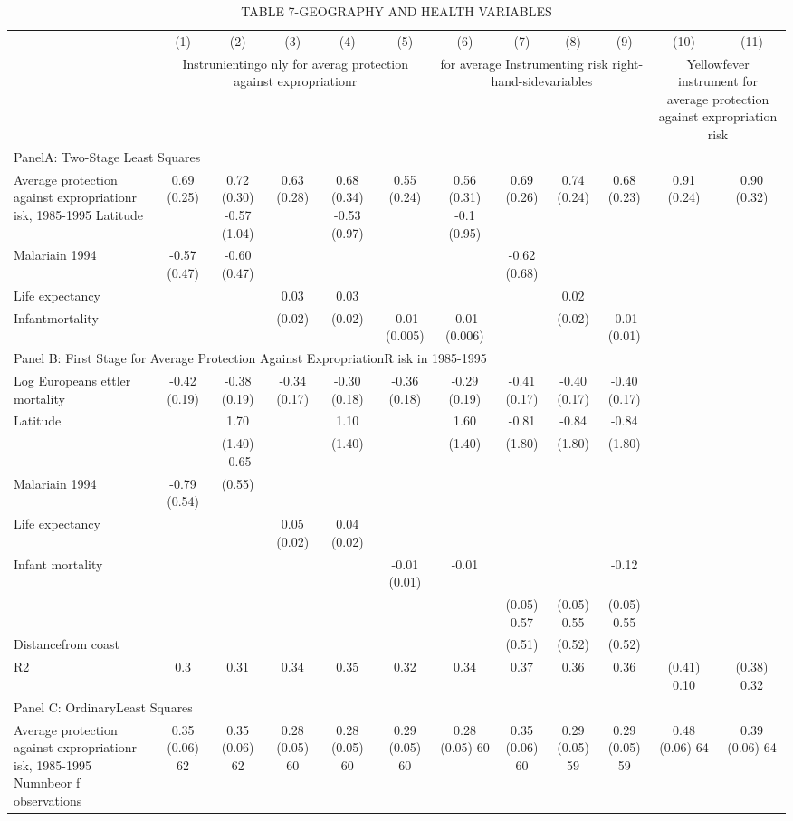 \begin{table}[htbp]
\centering
\caption{TABLE  7-GEOGRAPHY AND HEALTH  VARIABLES}
\begin{tabular}{lccccccccccc}
\hline
 & (1) & (2) & (3) & (4) & (5) & (6) & (7) & (8) & (9) & (10) & (11) \\
 & \multicolumn{5}{c}{Instrunientingo nly for averag protection against expropriationr} & \multicolumn{4}{c}{for average Instrumenting risk right-hand-sidevariables} & \multicolumn{2}{c}{Yellowfever instrument for average protection against expropriation risk} \\
\multicolumn{12}{l}{PanelA: Two-Stage Least Squares} \\
Average protection against expropriationr isk, 1985-1995 Latitude & 0.69 (0.25) & 0.72 (0.30) -0.57 (1.04) & 0.63 (0.28) & 0.68 (0.34) -0.53 (0.97) & 0.55 (0.24) & 0.56 (0.31) -0.1 (0.95) & 0.69 (0.26) & 0.74 (0.24) & 0.68 (0.23) & 0.91 (0.24) & 0.90 (0.32) \\
Malariain 1994 & -0.57 (0.47) & -0.60 (0.47) &  &  &  &  & -0.62 (0.68) &  &  &  &  \\
Life expectancy &  &  & 0.03 & 0.03 &  &  &  & 0.02 &  &  &  \\
Infantmortality &  &  & (0.02) & (0.02) & -0.01 (0.005) & -0.01 (0.006) &  & (0.02) & -0.01 (0.01) &  &  \\
\multicolumn{12}{l}{Panel B: First Stage for Average Protection Against ExpropriationR isk in 1985-1995} \\
Log Europeans ettler mortality & -0.42 (0.19) & -0.38 (0.19) & -0.34 (0.17) & -0.30 (0.18) & -0.36 (0.18) & -0.29 (0.19) & -0.41 (0.17) & -0.40 (0.17) & -0.40 (0.17) &  &  \\
Latitude &  & 1.70 &  & 1.10 &  & 1.60 & -0.81 & -0.84 & -0.84 &  &  \\
 &  & (1.40) -0.65 &  & (1.40) &  & (1.40) & (1.80) & (1.80) & (1.80) &  &  \\
Malariain 1994 & -0.79 (0.54) & (0.55) &  &  &  &  &  &  &  &  &  \\
Life expectancy &  &  & 0.05 (0.02) & 0.04 (0.02) &  &  &  &  &  &  &  \\
Infant mortality &  &  &  &  & -0.01 (0.01) & -0.01 &  &  & -0.12 &  &  \\
 &  &  &  &  &  &  & (0.05) 0.57 & (0.05) 0.55 & (0.05) 0.55 &  &  \\
Distancefrom coast &  &  &  &  &  &  & (0.51) & (0.52) & (0.52) &  &  \\
R2 & 0.3 & 0.31 & 0.34 & 0.35 & 0.32 & 0.34 & 0.37 & 0.36 & 0.36 & (0.41) 0.10 & (0.38) 0.32 \\
\multicolumn{12}{l}{Panel C: OrdinaryLeast Squares} \\
Average protection against expropriationr isk, 1985-1995 Numnbeor f observations & 0.35 (0.06) 62 & 0.35 (0.06) 62 & 0.28 (0.05) 60 & 0.28 (0.05) 60 & 0.29 (0.05) 60 & 0.28 (0.05) 60 & 0.35 (0.06) 60 & 0.29 (0.05) 59 & 0.29 (0.05) 59 & 0.48 (0.06) 64 & 0.39 (0.06) 64 \\
\hline
\end{tabular}
\end{table}
